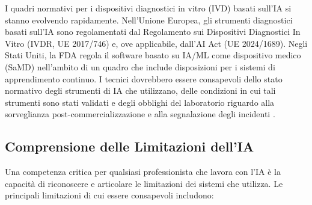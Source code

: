 I quadri normativi per i dispositivi diagnostici in vitro (IVD) basati sull'IA si stanno evolvendo rapidamente. Nell'Unione Europea, gli strumenti diagnostici basati sull'IA sono regolamentati dal Regolamento sui Dispositivi Diagnostici In Vitro (IVDR, UE 2017/746) e, ove applicabile, dall'AI Act (UE 2024/1689). Negli Stati Uniti, la FDA regola il software basato su IA/ML come dispositivo medico (SaMD) nell'ambito di un quadro che include disposizioni per i sistemi di apprendimento continuo. I tecnici dovrebbero essere consapevoli dello stato normativo degli strumenti di IA che utilizzano, delle condizioni in cui tali strumenti sono stati validati e degli obblighi del laboratorio riguardo alla sorveglianza post-commercializzazione e alla segnalazione degli incidenti \cite{bankhead2022}.

\subsection{Comprensione delle Limitazioni dell'IA}

Una competenza critica per qualsiasi professionista che lavora con l'IA è la capacità di riconoscere e articolare le limitazioni dei sistemi che utilizza. Le principali limitazioni di cui essere consapevoli includono:

